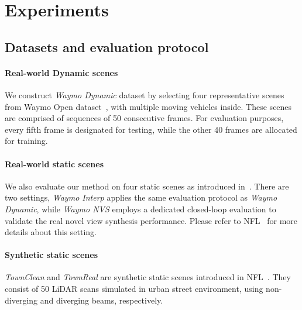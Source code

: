 \section{Experiments}

\subsection{Datasets and evaluation protocol}\label{sec:datasets}

\paragraph{Real-world Dynamic scenes} 
We construct \textit{Waymo Dynamic} dataset by selecting four representative scenes from Waymo Open dataset~\cite{sun2020scalability}, with multiple moving vehicles inside. These scenes are comprised of sequences of 50 consecutive frames. For evaluation purposes, every fifth frame is designated for testing, while the other 40 frames are allocated for training.


\paragraph{Real-world static scenes}
We also evaluate our method on four static scenes as introduced in~\cite{Huang2023nfl}. There are two settings, \textit{Waymo Interp} applies the same evaluation protocol as \textit{Waymo Dynamic}, while \textit{Waymo NVS} employs a dedicated closed-loop evaluation to validate the real novel view synthesis performance. Please refer to NFL~\cite{Huang2023nfl} for more details about this setting. 
 


\paragraph{Synthetic static scenes}  
\textit{TownClean} and \textit{TownReal} are synthetic static scenes introduced in NFL~\cite{Huang2023nfl}. They consist of 50 LiDAR scans simulated in urban street environment, using non-diverging and diverging beams, respectively. 



